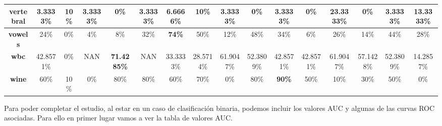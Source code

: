 \begin{table}
{\begin{tabular}{|c|c|c|c|c|c|c|c|c|c|c|c|c|c|c|c|}
		\textbf{vertebral}        & 3.3333\%           & 10\%               & 3.3333\%        & 0\%                & 3.3333\%      & 6.6666\%           & 10\%               & 3.3333\%           & 0\%          & 3.3333\%           & 0\%                & \textbf{23.3333\%} & 0\%                & 3.3333\%           & 13.3333\%    \\ \hline
		\textbf{vowels}           & 24\%               & 0\%                & 4\%             & 8\%                & 32\%          & \textbf{74\%}      & 50\%               & 12\%               & 48\%         & 34\%               & 6\%                & 26\%               & 14\%               & 44\%               & 28\%         \\ \hline
		\textbf{wbc}              & 42.8571\%          & 0\%                & NAN             & \textbf{71.4285\%} & NAN           & 33.3333\%          & 28.5714\%          & 61.9047\%          & 52.3809\%    & 42.8571\%          & 42.8571\%          & 61.9047\%          & 57.1428\%          & 52.3809\%          & 14.2857\%    \\ \hline
		\textbf{wine}             & 60\%               & 10\%               & 0\%             & 80\%               & 80\%          & 60\%               & 70\%               & 0\%                & 80\%         & \textbf{90\%}      & 50\%               & 10\%               & 30\%               & 50\%               & 0\%          \\ \hline
	\end{tabular}
}
\end{table}

\clearpage

Para poder completar el estudio, al estar en un caso de clasificación binaria, podemos incluir los valores AUC y algunas de las curvas ROC asociadas. Para ello en primer lugar vamos a ver la tabla de valores AUC.

\clearpage


